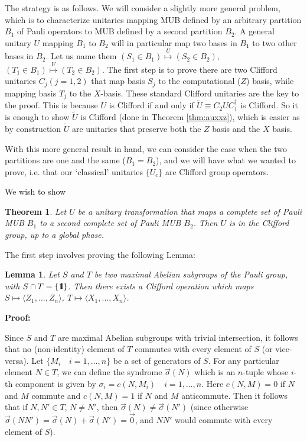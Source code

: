 \documentclass[aps,twocolumn,showpacs,nofootinbib,superscriptaddress]{revtex4}
\newtheorem{theorem}{Theorem}
\newtheorem{lemma}{Lemma}
\newcommand{\Zs}{\langle Z_1, \ldots, Z_n \rangle}
\newcommand{\Xs}{\langle X_1, \ldots, X_n \rangle}
\newcommand{\proof}{{\bf Proof:}}
\begin{document}
The strategy is as follows. We will consider a slightly more
general problem, which is to characterize unitaries mapping MUB
defined by an arbitrary partition $B_1$ of Pauli operators to MUB
defined by a second partition $B_2$. A general unitary $U$ mapping
$B_1$ to $B_2$ will in particular map two bases in $B_1$ to two
other bases in $B_2$. Let us name them $(S_1 \in
B_1)\stackrel{U}{\mapsto} (S_2 \in B_2)$, $(T_1 \in B_1)
\stackrel{U}{\mapsto} (T_2 \in B_2)$. The first step is to prove
there are two Clifford unitaries $C_j (j=1,2)$ that map basis
$S_j$ to the computational ($Z$) basis, while mapping basis $T_j$
to the $X$-basis. These standard Clifford unitaries are the key to
the proof. This is because $U$ is Clifford if and only if
$\tilde{U} \equiv C_2UC_1^\dagger$ is Clifford. So it is enough to
show $\tilde{U}$ is Clifford (done in Theorem \ref{thm:auxxz}),
which is easier as by construction $\tilde{U}$ are unitaries that
preserve both the $Z$ basis and the $X$ basis.

With this more general result in hand, we can consider the case when the two partitions
are one and the same ($B_1=B_2$), and we will have what we wanted to prove, i.e. that
our `classical' unitaries $\{U_c\}$ are Clifford group operators.

We wish to show
\begin{theorem}
Let $U$ be a unitary transformation that maps a complete set of Pauli MUB $B_1$ to
a second complete set of Pauli MUB $B_2$.  Then $U$ is in the Clifford group, up to
a global phase. \label{thm:MUBequiv}
\end{theorem}

The first step involves proving the following Lemma:
\begin{lemma}
Let $S$ and $T$ be two maximal Abelian subgroups of the Pauli
group, with $S \cap T = \left\{ \mbox{$1 \hspace{-1.0mm}  {\bf
l}$}\right\}$. Then there exists a Clifford operation which maps
$S \mapsto \Zs$, $T \mapsto \Xs$.
\end{lemma}
\proof

Since $S$ and $T$ are maximal Abelian subgroups with trivial
intersection, it follows that no (non-identity) element of $T$
commutes with every element of $S$ (or vice-versa).
Let $\{M_i \quad i = 1, \ldots, n\}$ be a set of generators of
$S$. For any particular element $N \in T$, we can define the
syndrome $\vec{\sigma}(N)$ which is an $n$-tuple whose $i$-th component
is given by $\sigma_i = c(N, M_i) \quad i = 1, \ldots, n$. Here
$c(N, M) = 0$ if $N$ and $M$ commute and $c(N,M) = 1$ if $N$ and
$M$ anticommute.  Then it follows that if $N, N' \in T$, $N \neq
N'$, then $\vec{\sigma}(N) \neq \vec{\sigma}(N')$ (since otherwise
$\vec{\sigma}(NN') = \vec{\sigma}(N) + \vec{\sigma}(N') = \vec{0}$,
and $NN'$ would commute with every element of $S$).
\end{document}
